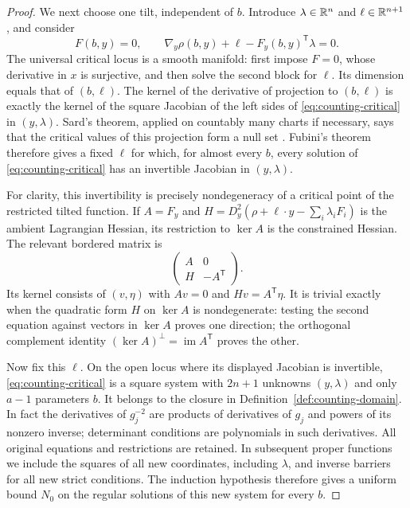 \begin{proof}
We next choose one tilt, independent of $b$.  Introduce
$\lambda\in\mathbb{R}^n$ and $\ell\in\mathbb{R}^{n+1}$, and consider
\begin{equation}\label{eq:counting-critical}
 F(b,y)=0,
 \qquad
 \nabla_y\rho(b,y)+\ell-F_y(b,y)^{\mathsf T}\lambda=0.
\end{equation}
The universal critical locus is a smooth manifold: first impose
$F=0$, whose derivative in $x$ is surjective, and then solve the second
block for $\ell$.  Its dimension equals that of $(b,\ell)$.  The
kernel of the derivative of projection to $(b,\ell)$ is exactly the
kernel of the square Jacobian of the left sides of
\eqref{eq:counting-critical} in $(y,\lambda)$.
Sard's theorem, applied on countably many charts if necessary, says
that the critical values of this projection form a null set
\cite{Sard1942}.  Fubini's theorem therefore gives a fixed $\ell$ for
which, for almost every $b$, every solution of
\eqref{eq:counting-critical} has an invertible Jacobian in
$(y,\lambda)$.

For clarity, this invertibility is precisely nondegeneracy of a
critical point of the restricted tilted function.  If $A=F_y$ and
$H=D_y^2(\rho+\ell\cdot y-\sum_i\lambda_iF_i)$ is the ambient
Lagrangian Hessian, its restriction to $\ker A$ is the constrained
Hessian.  The relevant bordered matrix is
\[
 \begin{pmatrix} A&0\\ H&-A^{\mathsf T}\end{pmatrix}.
\]
Its kernel consists of $(v,\eta)$ with $Av=0$ and
$Hv=A^{\mathsf T}\eta$.  It is trivial exactly when the quadratic
form $H$ on $\ker A$ is nondegenerate: testing the second equation
against vectors in $\ker A$ proves one direction; the orthogonal
complement identity $(\ker A)^\perp=\operatorname{im} A^{\mathsf T}$
proves the other.

Now fix this $\ell$.  On the open locus where its displayed Jacobian
is invertible, \eqref{eq:counting-critical} is a square system with
$2n+1$ unknowns $(y,\lambda)$ and only $a-1$ parameters $b$.
It belongs to the closure in Definition~\ref{def:counting-domain}.
In fact the derivatives of $g_j^{-2}$ are products of derivatives of
$g_j$ and powers of its nonzero inverse; determinant conditions are
polynomials in such derivatives.  All original equations and
restrictions are retained.  In subsequent proper functions we include
the squares of all new coordinates, including $\lambda$, and inverse
barriers for all new strict conditions.  The induction hypothesis
therefore gives a uniform bound $N_0$ on the regular solutions of this
new system for every $b$.


\end{proof}
